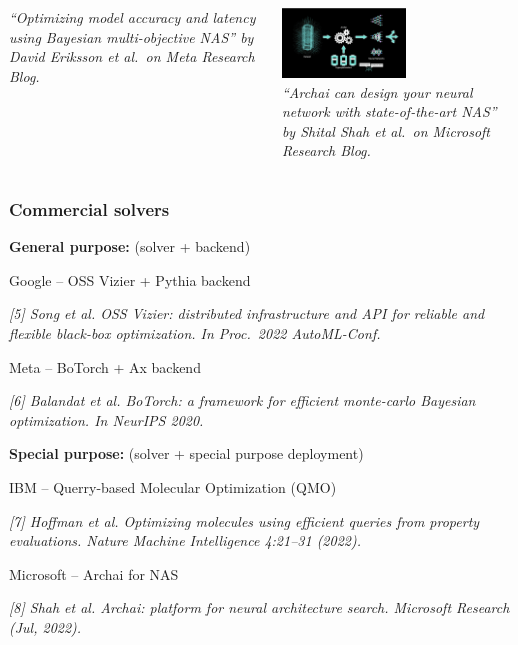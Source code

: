 \documentclass[aspectratio=169]{beamer}
\begin{document}
\begin{frame}
\begin{columns}
\begin{column}{0.33\textwidth}
\begin{center}
{\tiny \sl
``Optimizing model accuracy and latency using Bayesian multi-objective NAS''
by David Eriksson et al.\ on Meta Research Blog.\\
}
\end{center}
\end{column}
\pause
\begin{column}{0.33\textwidth}
\begin{center}
\includegraphics[height=5em]{../img/probs/microsoft-nas.png}\\
{\tiny \sl
``Archai can design your neural network with state-of-the-art NAS''
by Shital Shah et al.\ on Microsoft Research Blog.\\
}
\end{center}
\end{column}
\end{columns}
\end{frame}

\begin{frame}\frametitle{Commercial solvers}

\pause

{\large \bf General purpose:} (solver + backend)\\

\bigskip

Google -- OSS Vizier + Pythia backend

{\tiny\it
[5] Song et al.
OSS Vizier: distributed infrastructure and API for reliable and flexible black-box optimization.
In Proc.\ 2022 AutoML-Conf.
}

\bigskip

Meta -- BoTorch + Ax backend

{\tiny\it
[6] Balandat et al.
BoTorch: a framework for efficient monte-carlo Bayesian optimization.
In NeurIPS 2020.
}

\bigskip
\pause

{\large \bf Special purpose:} (solver + special purpose deployment)\\

\bigskip

IBM -- Querry-based Molecular Optimization (QMO)

{\tiny\it
[7] Hoffman et al.
Optimizing molecules using efficient queries from property evaluations.
Nature Machine Intelligence 4:21--31 (2022).
}

\bigskip

Microsoft -- Archai for NAS

{\tiny\it
[8] Shah et al.
Archai: platform for neural architecture search.
Microsoft Research (Jul, 2022).
}
\end{frame}
\end{document}

